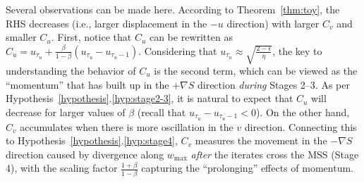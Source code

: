Several observations can be made here.
According to Theorem~\ref{thm:toy}, the RHS decreases (i.e., larger displacement in the $-u$ direction) with larger $C_v$ and smaller $C_u$. 
First, notice that $C_u$ can be rewritten as $C_u = u_{\tau_u} + \frac{\beta}{1-\beta} (u_{\tau_u} - u_{\tau_u-1})$. Considering that $u_{\tau_u} \approx \sqrt{\frac{2-\epsilon}{\eta}}$, the key to understanding the behavior of $C_u$ is the second term, which can be viewed as the ``momentum'' that has built up in the $+\nabla S$ direction \emph{during} Stages 2--3. As per Hypothesis~\ref{hypothesis}.\ref{hyp:stage2-3}, it is natural to expect that $C_u$ will decrease for larger values of $\beta$ (recall that $u_{\tau_u} - u_{\tau_u-1} < 0$).
On the other hand, $C_v$ accumulates when there is more oscillation in the $v$ direction. Connecting this to Hypothesis~\ref{hypothesis}.\ref{hyp:stage4}, $C_v$ measures the movement in the $-\nabla S$ direction caused by divergence along $w_{\max}$ {\it after} the iterates cross the MSS (Stage 4), with the scaling factor $\frac{1+\beta}{1-\beta}$ capturing the ``prolonging'' effects of momentum.



